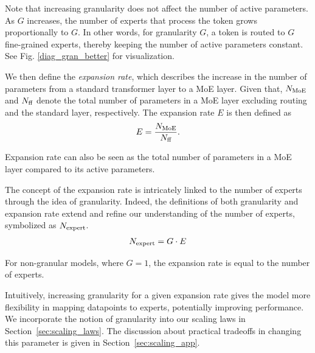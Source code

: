 Note that increasing granularity does not affect the number of active parameters. As $G$ increases, the number of experts that process the token grows proportionally to $G$. In other words, for granularity $G$, a token is routed to $G$ fine-grained experts, thereby keeping the number of active parameters constant. See Fig. \ref{diag_gran_better} for visualization.

We then define the \textit{expansion rate}, which describes the increase in the number of parameters from a standard transformer layer to a MoE layer. Given that, $N_\text{MoE}$ and $N_\text{ff}$ denote the total number of parameters in a MoE layer excluding routing and the standard \ff{} layer, respectively. The expansion rate $E$ is then defined as 
\begin{align*}
    E = \frac{N_\text{MoE}}{N_\text{ff}}.
\end{align*}

Expansion rate can also be seen as the total number of parameters in a MoE layer compared to its active parameters. 

The concept of the expansion rate is intricately linked to the number of experts through the idea of granularity. Indeed, the definitions of both granularity and expansion rate extend and refine our understanding of the number of experts, symbolized as $N_\text{expert}$.
\begin{align}
    N_\text{expert} = G \cdot E
\end{align}

For non-granular models, where $G=1$, the expansion rate is equal to the number of experts. 



Intuitively, increasing granularity for a given expansion rate gives the model more flexibility in mapping datapoints to experts, potentially improving performance. We incorporate the notion of granularity into our scaling laws in Section~\ref{sec:scaling_laws}. The discussion about practical tradeoffs in changing this parameter is given in Section~\ref{sec:scaling_app}.

